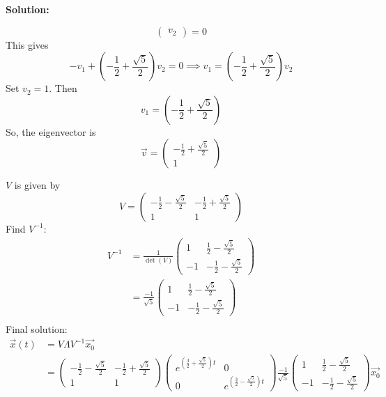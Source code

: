 \documentclass[12pt]{article}
\newenvironment{solution}{
    \textbf{Solution:}
    
}{
    
    \vspace{2em}
}
\begin{document}
\begin{solution}
\begin{itemize}
\[\begin{pmatrix}
            v_2
        \end{pmatrix} = 0
        \]
        This gives
        \[
            -v_1 + \left(-\frac{1}{2} + \frac{\sqrt{5}}{2}\right)v_2 = 0 \implies v_1 = \left(-\frac{1}{2} + \frac{\sqrt{5}}{2}\right)v_2
        \]
        Set \(v_2 = 1\). Then
        \[
            v_1 = \left(-\frac{1}{2} + \frac{\sqrt{5}}{2}\right)
        \]
        So, the eigenvector is
        \[
            \vec{v} = \begin{pmatrix}
                -\frac{1}{2} + \frac{\sqrt{5}}{2} \\
                1
            \end{pmatrix}
        \]
    \end{itemize}
    \(V\) is given by
    \[
        V = \begin{pmatrix}
            -\frac{1}{2} - \frac{\sqrt{5}}{2} & -\frac{1}{2} + \frac{\sqrt{5}}{2} \\
            1 & 1
        \end{pmatrix}
    \]
    Find \(V^{-1}\):
        \[
            \begin{aligned}
                V^{-1} &= \frac{1}{\det(V)} \begin{pmatrix}
                    1 & \frac{1}{2} - \frac{\sqrt{5}}{2} \\
                    -1 & -\frac{1}{2} - \frac{\sqrt{5}}{2}
                \end{pmatrix} \\
                &= \frac{-1}{\sqrt{5}} \begin{pmatrix}
                    1 & \frac{1}{2} - \frac{\sqrt{5}}{2} \\
                    -1 & -\frac{1}{2} - \frac{\sqrt{5}}{2}
                \end{pmatrix}\\
            \end{aligned}
    \]
    Final solution:
    \[
        \begin{aligned}
            \vec{x}(t) &= V\Lambda V^{-1}\vec{x_0} \\
            &= \begin{pmatrix}
                -\frac{1}{2} - \frac{\sqrt{5}}{2} & -\frac{1}{2} + \frac{\sqrt{5}}{2} \\
                1 & 1
            \end{pmatrix}
            \begin{pmatrix}
                e^{\left(\frac{3}{2} + \frac{\sqrt{5}}{2}\right)t} & 0 \\
                0 & e^{\left(\frac{3}{2} - \frac{\sqrt{5}}{2}\right)t}
            \end{pmatrix}
            \frac{-1}{\sqrt{5}} \begin{pmatrix}
                1 & \frac{1}{2} - \frac{\sqrt{5}}{2} \\
                -1 & -\frac{1}{2} - \frac{\sqrt{5}}{2}
            \end{pmatrix}\vec{x_0}
        \end{aligned}
    \]
\end{solution}
\end{document}
